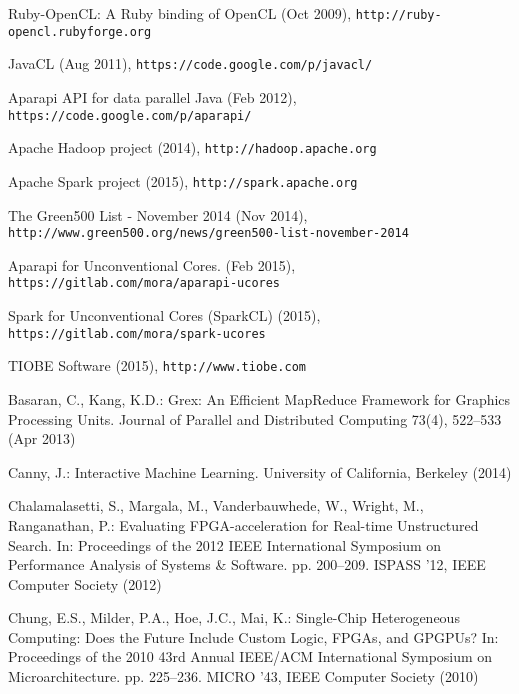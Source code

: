 \documentclass[runningheads,a4paper]{llncs}
\begin{document}
%
%

\begin{thebibliography}{22}
\providecommand{\natexlab}[1]{#1}
\providecommand{\url}[1]{\texttt{#1}}
\providecommand{\urlprefix}{}

{Ruby-OpenCL: A Ruby binding of OpenCL} (Oct 2009),
  \urlprefix\url{http://ruby-opencl.rubyforge.org}

{JavaCL} (Aug 2011), \urlprefix\url{https://code.google.com/p/javacl/}

{Aparapi API for data parallel Java} (Feb 2012),
  \urlprefix\url{https://code.google.com/p/aparapi/}

{Apache Hadoop project} (2014), \urlprefix\url{http://hadoop.apache.org}

{Apache Spark project} (2015), \urlprefix\url{http://spark.apache.org}

{The Green500 List - November 2014} (Nov 2014),
  \urlprefix\url{http://www.green500.org/news/green500-list-november-2014}

{Aparapi for Unconventional Cores.} (Feb 2015),
  \urlprefix\url{https://gitlab.com/mora/aparapi-ucores}

{Spark for Unconventional Cores (SparkCL)} (2015),
  \urlprefix\url{https://gitlab.com/mora/spark-ucores}

{TIOBE Software} (2015), \urlprefix\url{http://www.tiobe.com}

Basaran, C., Kang, K.D.: {Grex: An Efficient MapReduce Framework for Graphics
  Processing Units}.
\newblock Journal of Parallel and Distributed Computing 73(4), 522--533 (Apr 2013)

Canny, J.: {Interactive Machine Learning}.
\newblock University of California, Berkeley  (2014)

Chalamalasetti, S., Margala, M., Vanderbauwhede, W., Wright, M., Ranganathan,
  P.: {Evaluating FPGA-acceleration for Real-time Unstructured Search}.
\newblock In: Proceedings of the 2012 IEEE International Symposium on
  Performance Analysis of Systems \& Software. pp. 200--209. ISPASS '12, IEEE
  Computer Society (2012)

Chung, E.S., Milder, P.A., Hoe, J.C., Mai, K.: {Single-Chip Heterogeneous
  Computing: Does the Future Include Custom Logic, FPGAs, and GPGPUs?}
\newblock In: Proceedings of the 2010 43rd Annual IEEE/ACM International
  Symposium on Microarchitecture. pp. 225--236. MICRO '43, IEEE Computer
  Society (2010)


\end{thebibliography}
\end{document}

